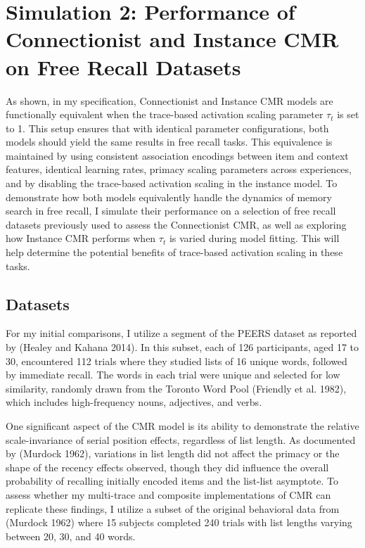 \documentclass[
  letterpaper,
  11pt,
  english,
  singlespacing,
  headsepline]{MastersDoctoralThesis}
\begin{document}
\section{Simulation 2: Performance of Connectionist and Instance CMR on
Free Recall
Datasets}\label{simulation-2-performance-of-connectionist-and-instance-cmr-on-free-recall-datasets}

As shown, in my specification, Connectionist and Instance CMR models are
functionally equivalent when the trace-based activation scaling
parameter \(\tau_{t}\) is set to 1. This setup ensures that with
identical parameter configurations, both models should yield the same
results in free recall tasks. This equivalence is maintained by using
consistent association encodings between item and context features,
identical learning rates, primacy scaling parameters across experiences,
and by disabling the trace-based activation scaling in the instance
model. To demonstrate how both models equivalently handle the dynamics
of memory search in free recall, I simulate their performance on a
selection of free recall datasets previously used to assess the
Connectionist CMR, as well as exploring how Instance CMR performs when
\(\tau_{t}\) is varied during model fitting. This will help determine
the potential benefits of trace-based activation scaling in these tasks.

\subsection{Datasets}\label{datasets}

For my initial comparisons, I utilize a segment of the PEERS dataset as
reported by (Healey and Kahana 2014). In this subset, each of 126
participants, aged 17 to 30, encountered 112 trials where they studied
lists of 16 unique words, followed by immediate recall. The words in
each trial were unique and selected for low similarity, randomly drawn
from the Toronto Word Pool (Friendly et al. 1982), which includes
high-frequency nouns, adjectives, and verbs.

One significant aspect of the CMR model is its ability to demonstrate
the relative scale-invariance of serial position effects, regardless of
list length. As documented by (Murdock 1962), variations in list length
did not affect the primacy or the shape of the recency effects observed,
though they did influence the overall probability of recalling initially
encoded items and the list-list asymptote. To assess whether my
multi-trace and composite implementations of CMR can replicate these
findings, I utilize a subset of the original behavioral data from
(Murdock 1962) where 15 subjects completed 240 trials with list lengths
varying between 20, 30, and 40 words.
\end{document}
